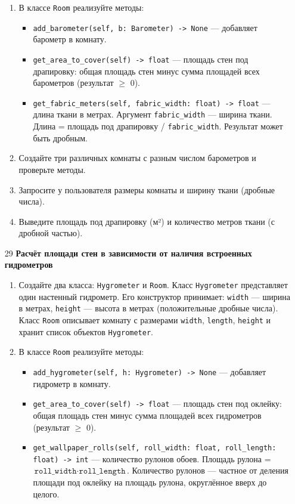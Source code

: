 \begin{enumerate}
\begin{enumerate}
    \item В классе \texttt{Room} реализуйте методы:  
    \begin{itemize}
        \item \texttt{add\_barometer(self, b: Barometer) -> None} — добавляет барометр в комнату.
        \item \texttt{get\_area\_to\_cover(self) -> float} — площадь стен под драпировку: общая площадь стен минус сумма площадей всех барометров (результат $\geqslant$ 0).
        \item \texttt{get\_fabric\_meters(self, fabric\_width: float) -> float} — длина ткани в метрах. Аргумент \texttt{fabric\_width} — ширина ткани. Длина = площадь под драпировку / \texttt{fabric\_width}. Результат может быть дробным.
    \end{itemize}

    \item Создайте три различных комнаты с разным числом барометров и проверьте методы.

    \item Запросите у пользователя размеры комнаты и ширину ткани (дробные числа).

    \item Выведите площадь под драпировку (м²) и количество метров ткани (с дробной частью).
\end{enumerate}

\item[29] \textbf{Расчёт площади стен в зависимости от наличия встроенных гидрометров}
\begin{enumerate}
    \item Создайте два класса: \texttt{Hygrometer} и \texttt{Room}.  
    Класс \texttt{Hygrometer} представляет один настенный гидрометр. Его конструктор принимает:  
    \texttt{width} — ширина в метрах,  
    \texttt{height} — высота в метрах (положительные дробные числа).  
    Класс \texttt{Room} описывает комнату с размерами \texttt{width}, \texttt{length}, \texttt{height} и хранит список объектов \texttt{Hygrometer}.

    \item В классе \texttt{Room} реализуйте методы:  
    \begin{itemize}
        \item \texttt{add\_hygrometer(self, h: Hygrometer) -> None} — добавляет гидрометр в комнату.
        \item \texttt{get\_area\_to\_cover(self) -> float} — площадь стен под оклейку: общая площадь стен минус сумма площадей всех гидрометров (результат $\geqslant$ 0).
        \item \texttt{get\_wallpaper\_rolls(self, roll\_width: float, roll\_length: float) -> int} — количество рулонов обоев. Площадь рулона = \(\texttt{roll\_width} \cdot \texttt{roll\_length}\). Количество рулонов — частное от деления площади под оклейку на площадь рулона, округлённое вверх до целого.
    \end{itemize}


\end{enumerate}
\end{enumerate}

